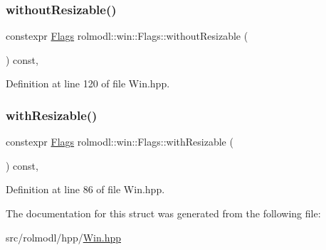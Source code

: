 \subsubsection{\texorpdfstring{withoutResizable()}{withoutResizable()}}
{\footnotesize\ttfamily constexpr \mbox{\hyperlink{structrolmodl_1_1win_1_1_flags}{Flags}} rolmodl\+::win\+::\+Flags\+::without\+Resizable (\begin{DoxyParamCaption}{ }\end{DoxyParamCaption}) const\hspace{0.3cm}{\ttfamily [inline]}, {\ttfamily [noexcept]}}



Definition at line 120 of file Win.\+hpp.

\mbox{\label{structrolmodl_1_1win_1_1_flags_a2930264d9addddb6b90fe6fe70d0c16f}} 
\subsubsection{\texorpdfstring{withResizable()}{withResizable()}}
{\footnotesize\ttfamily constexpr \mbox{\hyperlink{structrolmodl_1_1win_1_1_flags}{Flags}} rolmodl\+::win\+::\+Flags\+::with\+Resizable (\begin{DoxyParamCaption}{ }\end{DoxyParamCaption}) const\hspace{0.3cm}{\ttfamily [inline]}, {\ttfamily [noexcept]}}



Definition at line 86 of file Win.\+hpp.



The documentation for this struct was generated from the following file\+:\begin{DoxyCompactItemize}
\item 
src/rolmodl/hpp/\mbox{\hyperlink{_win_8hpp}{Win.\+hpp}}\end{DoxyCompactItemize}
